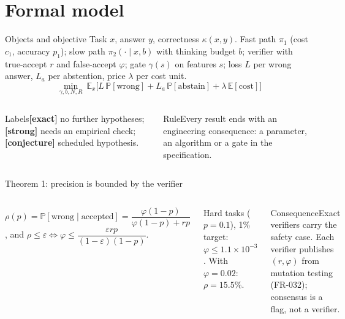 \documentclass[aspectratio=169,10pt]{beamer}
\renewcommand{\Pr}{\mathbb{P}}
\begin{document}
\section{Formal model}
\begin{frame}{Objects and objective}
\small
Task $x$, answer $y$, correctness $\kappa(x,y)$. Fast path $\pi_1$ (cost $c_1$, accuracy $p_1$); slow path $\pi_2(\cdot\mid x,b)$ with thinking budget $b$; verifier with true-accept $r$ and false-accept $\varphi$; gate $\gamma(s)$ on features $s$; loss $L$ per wrong answer, $L_a$ per abstention, price $\lambda$ per cost unit.
\begin{equation*}
\min_{\gamma,b,N,R}\ \mathbb E_x\big[L\,\Pr[\text{wrong}]+L_a\,\Pr[\text{abstain}]+\lambda\,\mathbb E[\text{cost}]\big]
\end{equation*}
\begin{columns}[T]
\begin{block}{Labels}\textbf{[exact]} no further hypotheses; \textbf{[strong]} needs an empirical check; \textbf{[conjecture]} scheduled hypothesis.\end{block}
\begin{exampleblock}{Rule}Every result ends with an engineering consequence: a parameter, an algorithm or a gate in the specification.\end{exampleblock}
\end{columns}
\end{frame}

\begin{frame}{Theorem 1: precision is bounded by the verifier}
\begin{columns}[T]
\begin{theorem}
$\rho(p)=\Pr[\text{wrong}\mid\text{accepted}]=\dfrac{\varphi(1-p)}{\varphi(1-p)+rp}$, and $\rho\le\varepsilon\iff\varphi\le\dfrac{\varepsilon rp}{(1-\varepsilon)(1-p)}$.
\end{theorem}
\small Hard tasks ($p=0.1$), 1\% target: $\varphi\le1.1\times10^{-3}$. With $\varphi=0.02$: $\rho=15.5\%$.
\begin{alertblock}{Consequence}Exact verifiers carry the safety case. Each verifier publishes $(r,\varphi)$ from mutation testing (FR-032); consensus is a flag, not a verifier.\end{alertblock}
\end{columns}
\end{frame}
\end{document}
